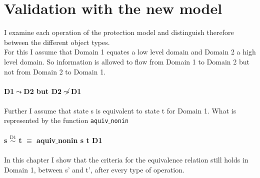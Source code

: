 \documentclass[11pt,a4paper,twoside]{article}
\begin{document}
\section{Validation with the new model}\label{sec:ValNew}
I examine each operation of the protection model and distinguish therefore between the different object types. \\
For this I assume that Domain 1 equates a low level domain and Domain 2 a high level domain. So  information is allowed to flow from Domain 1 to Domain 2 but not from Domain 2 to Domain 1. \\ \\
\textbf{D1$\leadsto$D2 but D2$\not\leadsto$D1} \\ \\
Further I assume that state s is equivalent to state t for Domain 1. What is represented by the function  \texttt{aquiv$\_$nonin} \\ \\
\textbf{s $\overset{\text{D1}}{\sim}$ t $\equiv$ aquiv$\_$nonin s t D1}	\\ \\
In this chapter I show that the criteria for the equivalence relation still holds in Domain 1, between s' and t', after every type of operation. 

\clearpage

\clearpage
 
\clearpage

\clearpage

\clearpage

\clearpage

\clearpage
\end{document}
